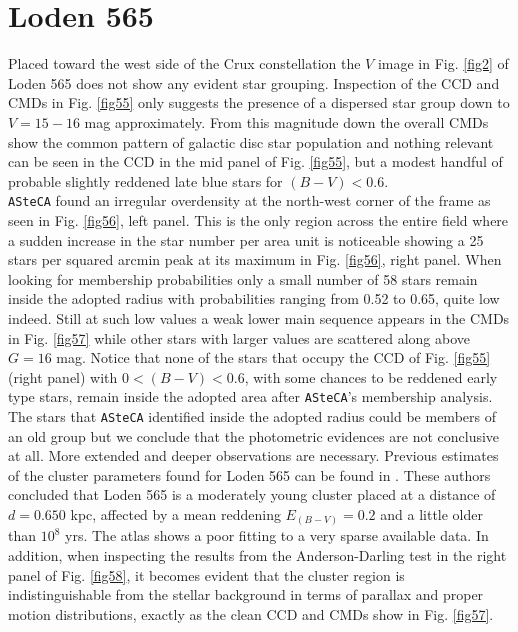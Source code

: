 \documentclass[draft]{aa}
\begin{document}
\section{Loden 565}

Placed toward the west side of the Crux constellation the $V$ image in Fig. 
\ref{fig2} of Loden 565 does not show any evident star grouping. Inspection of
the CCD and CMDs in Fig. \ref{fig55} only suggests the presence of a dispersed
star group down to $V= 15-16$ mag approximately. From this magnitude down the
overall CMDs show the common pattern of galactic disc star population and
nothing relevant can be seen in the CCD in the mid panel of Fig. \ref{fig55}, but
a modest handful of probable slightly reddened late blue stars for
$(B-V)<0.6$.\\

\texttt{ASteCA} found an irregular overdensity at the north-west corner of the
frame as seen in Fig. \ref{fig56}, left panel. This is the only region across the
entire field where a sudden increase in the star number per area unit is
noticeable showing a 25 stars per squared arcmin peak at its maximum in Fig. 
\ref{fig56}, right panel.
%
When looking for membership probabilities only a small number of 58 stars
remain inside the adopted radius with probabilities ranging from 0.52 to 0.65,
quite low indeed. Still at such low values a weak lower main sequence appears
in the CMDs in Fig. \ref{fig57} while other stars with larger values are
scattered along above $G=16$ mag. Notice that none of the stars that
occupy the CCD of Fig. \ref{fig55} (right panel) with $0<(B-V)<0.6$, with some
chances to be reddened early type stars, remain inside the adopted area after 
\texttt{ASteCA}'s membership analysis. The stars that \texttt{ASteCA}
identified inside the adopted radius could be members of an old group but we
conclude that the photometric evidences are not conclusive at all. More extended
and deeper observations are necessary. Previous estimates of the cluster
parameters found for Loden 565 can be found in \cite{Kharchenko_2005}.
These authors concluded that Loden 565 is a moderately young cluster placed at a
distance of $d = 0.650$ kpc, affected by a mean reddening $E_{(B-V)}= 0.2$ and
a little older than $10^8$ yrs. The \cite{Kharchenko_2005} atlas shows a
poor fitting to a very sparse available data. In addition, when inspecting the
results from the Anderson-Darling test in the right panel of Fig. \ref{fig58},
it becomes evident that the cluster region is indistinguishable from the
stellar background in terms of parallax and proper motion distributions,
exactly as the clean CCD and CMDs show in Fig. \ref{fig57}.\\
\end{document}
